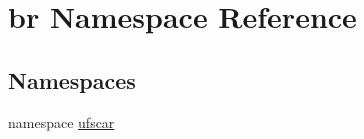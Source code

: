 \hypertarget{namespacebr}{
\section{br Namespace Reference}
\label{namespacebr}
}
\subsection*{Namespaces}
\begin{DoxyCompactItemize}
\item 
namespace \hyperlink{namespacebr_1_1ufscar}{ufscar}
\end{DoxyCompactItemize}
